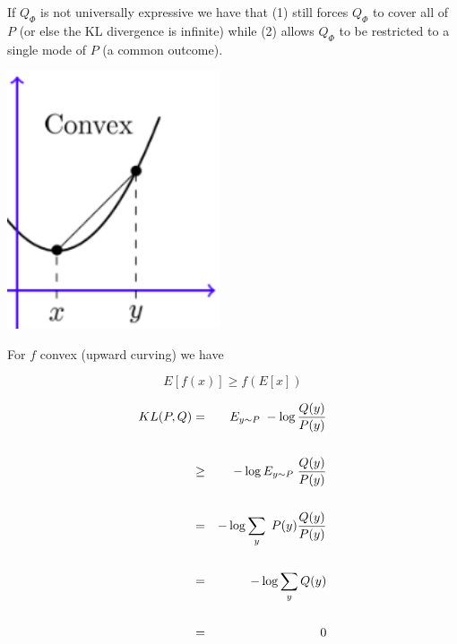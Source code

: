 {\vfill
If $Q_\Phi$ is not universally expressive we have that (1) still forces $Q_\Phi$ to cover all of $P$ (or else the KL divergence is infinite)
while (2) allows $Q_\Phi$ to be restricted to a single mode of $P$ (a common outcome).


\centerline{\includegraphics[height = 3.0in]{../images/Jensen}}

\vfill
For $f$ convex (upward curving) we have

\vfill
$$E[f(x)] \geq f(E[x])$$


\begin{eqnarray*}
  KL(P,Q) & = & E_{y \sim P}\;- \log \frac{Q(y)}{P(y)} \\
  \\
  & \geq & - \log E_{y\sim P}\;\frac{Q(y)}{P(y)} \\
  \\
  & = & - \log \sum_y\; P(y) \frac{Q(y)}{P(y)}  \\
  \\
  & = & - \log \sum_y Q(y) \\
  \\
  & = & 0
\end{eqnarray*}

}
